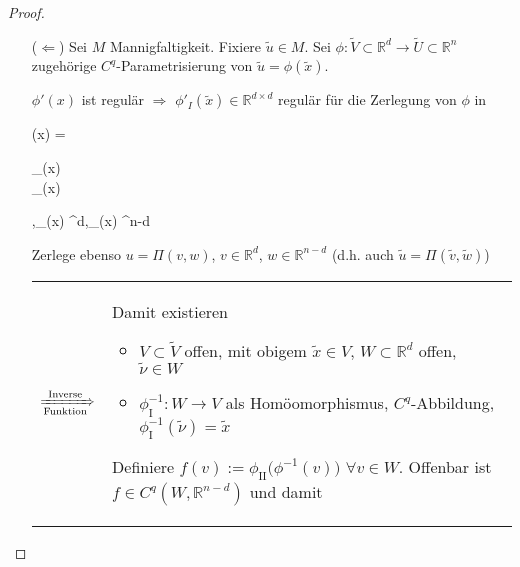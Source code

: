 \begin{proof}\hspace*{0pt}
	\vspace*{\dimexpr-\baselineskip+1mm\relax}
	\begin{itemize}
		\item[($\Leftarrow$)] Sei $M$ Mannigfaltigkeit. Fixiere $\tilde{u}\in M$. Sei $\phi\!:\tilde{V}\subset \mathbb{R}^d \to \tilde{U}\subset \mathbb{R}^n$ zugehörige $C^q$-Parametrisierung von $\tilde{u} = \phi(\tilde{x})$.
		
		$\phi'(x)$ ist regulär $\Rightarrow$ $\phi'_I (\tilde{x}) \in \mathbb{R}^{d\times d}$ regulär für die Zerlegung von $\phi$ in\begin{flalign*}
			\phi(x) = \Pi \begin{pmatrix} \phi_{}(x) \\ \phi_{}(x)\end{pmatrix},\quad \phi_{}(x) \in {}^d,\quad \phi_{}(x) \in {}^{n-d}
		\end{flalign*}
		
		Zerlege ebenso $u = \Pi(v,w)$, $v\in \mathbb{R}^{d}$, $w\in \mathbb{R}^{n-d}$ (d.h. auch $\tilde{u} = \Pi(\tilde{v}, \tilde{w})$)\par
		\begin{tabularx}{\linewidth}{r@{\ }X}
			$\xRightarrow[\text{Funktion}]{\text{Inverse}}$ &
			Damit existieren\par
			\begin{minipage}[t]{\linewidth}
				\begin{itemize}
					\item $V\subset \tilde{V}$ offen, mit obigem $\tilde{x} \in V$, $W\subset \mathbb{R}^d$ offen, $\tilde{\nu}\in W$
					\item $\phi^{-1}_{\text{I}}\!\!: W\to V$ als Homöomorphismus, $C^q$-Abbildung, $\phi_{\text{I}}^{-1}(\tilde{\nu}) = \tilde{x}$
				\end{itemize}
			\end{minipage}
			\vspace*{1mm}
			
			Definiere $f(v) := \phi_{\text{II}}\big(\phi^{-1}(v)\big)$ $\forall v\in W$. Offenbar ist $f\in C^q(W, \mathbb{R}^{n-d})$ und damit
			

\end{tabularx}
\end{itemize}
\end{proof}
